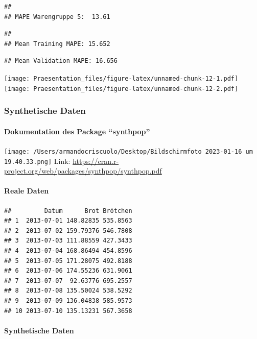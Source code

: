 \documentclass[
]{article}
\begin{document}
\begin{verbatim}
## 
## MAPE Warengruppe 5:  13.61
\end{verbatim}

\begin{verbatim}
## 
## Mean Training MAPE: 15.652
\end{verbatim}

\begin{verbatim}
## Mean Validation MAPE: 16.656
\end{verbatim}

\texttt{[image: Praesentation\_files/figure-latex/unnamed-chunk-12-1.pdf]}
\texttt{[image: Praesentation\_files/figure-latex/unnamed-chunk-12-2.pdf]}

\hypertarget{synthetische-daten}{%
\subsubsection{Synthetische Daten}\label{synthetische-daten}}

\hypertarget{dokumentation-des-package-synthpop}{%
\paragraph{Dokumentation des Package
``synthpop''}\label{dokumentation-des-package-synthpop}}

\texttt{[image: /Users/armandocriscuolo/Desktop/Bildschirm­foto 2023-01-16 um 19.40.33.png]}
Link:
\url{https://cran.r-project.org/web/packages/synthpop/synthpop.pdf}

\hypertarget{reale-daten}{%
\paragraph{Reale Daten}\label{reale-daten}}

\begin{verbatim}
##         Datum      Brot Brötchen
## 1  2013-07-01 148.82835 535.8563
## 2  2013-07-02 159.79376 546.7808
## 3  2013-07-03 111.88559 427.3433
## 4  2013-07-04 168.86494 454.8596
## 5  2013-07-05 171.28075 492.8188
## 6  2013-07-06 174.55236 631.9061
## 7  2013-07-07  92.63776 695.2557
## 8  2013-07-08 135.50024 538.5292
## 9  2013-07-09 136.04838 585.9573
## 10 2013-07-10 135.13231 567.3658
\end{verbatim}

\hypertarget{synthetische-daten-1}{%
\paragraph{Synthetische Daten}\label{synthetische-daten-1}}
\end{document}

